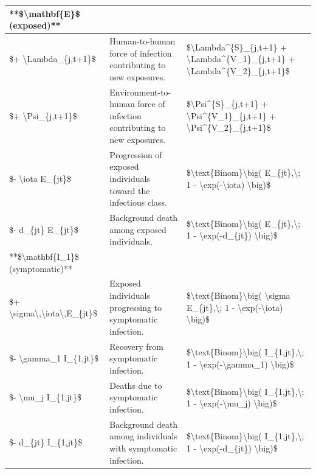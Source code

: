 \documentclass[
]{book}
\begin{document}
\begin{table}
\begin{tabular}[t]{l|l|l}
\hline
**\$\textbackslash{}mathbf\{E\}\$ (exposed)** &  & \\
\hline
\$+ \textbackslash{}Lambda\_\{j,t+1\}\$ & Human-to-human force of infection contributing to new exposures. & \$\textbackslash{}Lambda\textasciicircum{}\{S\}\_\{j,t+1\} + \textbackslash{}Lambda\textasciicircum{}\{V\_1\}\_\{j,t+1\} + \textbackslash{}Lambda\textasciicircum{}\{V\_2\}\_\{j,t+1\}\$\\
\hline
\$+ \textbackslash{}Psi\_\{j,t+1\}\$ & Environment-to-human force of infection contributing to new exposures. & \$\textbackslash{}Psi\textasciicircum{}\{S\}\_\{j,t+1\} + \textbackslash{}Psi\textasciicircum{}\{V\_1\}\_\{j,t+1\} + \textbackslash{}Psi\textasciicircum{}\{V\_2\}\_\{j,t+1\}\$\\
\hline
\$- \textbackslash{}iota E\_\{jt\}\$ & Progression of exposed individuals toward the infectious class. & \$\textbackslash{}text\{Binom\}\textbackslash{}big( E\_\{jt\},\textbackslash{}; 1 - \textbackslash{}exp(-\textbackslash{}iota) \textbackslash{}big)\$\\
\hline
\$- d\_\{jt\} E\_\{jt\}\$ & Background death among exposed individuals. & \$\textbackslash{}text\{Binom\}\textbackslash{}big( E\_\{jt\},\textbackslash{}; 1 - \textbackslash{}exp(-d\_\{jt\}) \textbackslash{}big)\$\\
\hline
**\$\textbackslash{}mathbf\{I\_1\}\$ (symptomatic)** &  & \\
\hline
\$+ \textbackslash{}sigma\textbackslash{},\textbackslash{}iota\textbackslash{},E\_\{jt\}\$ & Exposed individuals progressing to symptomatic infection. & \$\textbackslash{}text\{Binom\}\textbackslash{}big( \textbackslash{}sigma E\_\{jt\},\textbackslash{}; 1 - \textbackslash{}exp(-\textbackslash{}iota) \textbackslash{}big)\$\\
\hline
\$- \textbackslash{}gamma\_1 I\_\{1,jt\}\$ & Recovery from symptomatic infection. & \$\textbackslash{}text\{Binom\}\textbackslash{}big( I\_\{1,jt\},\textbackslash{}; 1 - \textbackslash{}exp(-\textbackslash{}gamma\_1) \textbackslash{}big)\$\\
\hline
\$- \textbackslash{}mu\_j I\_\{1,jt\}\$ & Deaths due to symptomatic infection. & \$\textbackslash{}text\{Binom\}\textbackslash{}big( I\_\{1,jt\},\textbackslash{}; 1 - \textbackslash{}exp(-\textbackslash{}mu\_j) \textbackslash{}big)\$\\
\hline
\$- d\_\{jt\} I\_\{1,jt\}\$ & Background death among individuals with symptomatic infection. & \$\textbackslash{}text\{Binom\}\textbackslash{}big( I\_\{1,jt\},\textbackslash{}; 1 - \textbackslash{}exp(-d\_\{jt\}) \textbackslash{}big)\$\\

\end{tabular}
\end{table}
\end{document}
